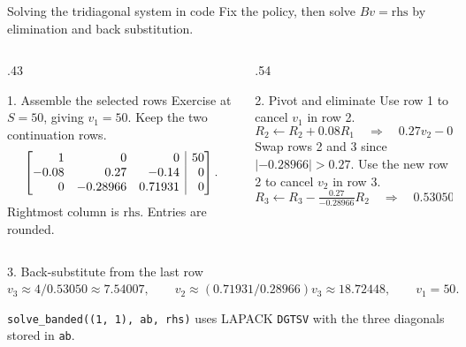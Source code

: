 \documentclass[aspectratio=169,11pt]{beamer}
\begin{document}
\begin{frame}[t]{Solving the tridiagonal system in code}
\small
Fix the policy, then solve $Bv=\mathrm{rhs}$ by elimination and back substitution.

\begin{columns}[T,onlytextwidth]
\begin{column}{.43\textwidth}
\begin{block}{1. Assemble the selected rows}
\small
Exercise at $S=50$, giving $v_1=50$. Keep the two continuation rows.
\setlength{\abovedisplayskip}{4pt}
\setlength{\belowdisplayskip}{4pt}
\setlength{\abovedisplayshortskip}{3pt}
\setlength{\belowdisplayshortskip}{3pt}
\setlength{\arraycolsep}{3pt}
\[
 \left[\begin{array}{@{}rrr|r@{}}
 1 & 0 & 0 & 50\\
 -0.08 & 0.27 & -0.14 & 0\\
 0 & -0.28966 & 0.71931 & 0
 \end{array}\right].
\]
\footnotesize
Rightmost column is $\mathrm{rhs}$. Entries are rounded.
\end{block}
\end{column}
\begin{column}{.54\textwidth}
\begin{block}{2. Pivot and eliminate}
\small
\setlength{\abovedisplayskip}{4pt}
\setlength{\belowdisplayskip}{4pt}
\setlength{\abovedisplayshortskip}{3pt}
\setlength{\belowdisplayshortskip}{3pt}
Use row 1 to cancel $v_1$ in row 2.
\[
 R_2\gets R_2+0.08R_1
 \quad\Longrightarrow\quad 0.27v_2-0.14v_3=4.
\]
Swap rows 2 and 3 since $|-0.28966|>0.27$.
Use the new row 2 to cancel $v_2$ in row 3.
\[
 R_3\gets R_3-\tfrac{0.27}{-0.28966}R_2
 \quad\Longrightarrow\quad 0.53050v_3\approx4.
\]
\end{block}
\end{column}
\end{columns}

\begin{block}{3. Back-substitute from the last row}
\small
$v_3\approx 4/0.53050\approx7.54007,\qquad
v_2\approx (0.71931/0.28966)v_3\approx18.72448,\qquad
v_1=50.$
\end{block}

\footnotesize
\texttt{solve\_banded((1, 1), ab, rhs)} uses LAPACK \texttt{DGTSV} with the three diagonals stored in \texttt{ab}.
\end{frame}
\end{document}
